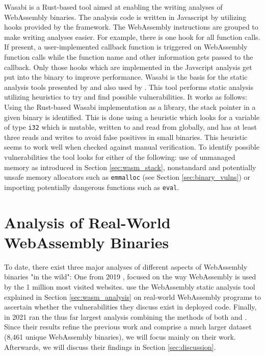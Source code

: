 \documentclass[sigconf]{acmart}
\begin{document}
Wasabi \cite{lehmann_wasabi_2018} is a Rust-based tool aimed at enabling the writing analyses of WebAssembly binaries. The analysis code is written in Javascript by utilizing hooks provided by the framework. The WebAssembly instructions are grouped to make writing analyses easier. For example, there is one hook for all function calls. If present, a user-implemented callback function is triggered on WebAssembly function calls while the function name and other information gets passed to the callback. Only those hooks which are implemented in the Javscript analysis get put into the binary to improve performance. Wasabi is the basis for the static analysis tools presented by \citet{lehmann_everything_2020} and also used by \citet{hilbig_empirical_2021}. This tool performs static analysis utilizing heuristics to try and find possible vulnerabilities. It works as follows: Using the Rust-based Wasabi implementation as a library, the stack pointer in a given binary is identified. This is done using a heuristic which looks for a variable of type \texttt{i32} which is mutable, written to and read from globally, and has at least three reads and writes to avoid false positives in small binaries. This heuristic seems to work well when checked against manual verification. To identify possible vulnerabilities the tool looks for either of the following: use of unmanaged memory as introduced in Section \ref{sec:wasm_stack}, nonstandard and potentially unsafe memory allocators such as \texttt{emmalloc} (see Section \ref{sec:binary_vulns}) or importing potentially dangerous functions such as \texttt{eval}.

\section{Analysis of Real-World WebAssembly Binaries}
\label{sec:real_world_wasm_analysis}
To date, there exist three major analyses of different aspects of WebAssembly binaries "in the wild": One from 2019 \cite{musch_new_2019}, focused on the way WebAssembly is used by the 1 million most visited websites. \citet{lehmann_everything_2020} use the WebAssembly static analysis tool explained in Section \ref{sec:wasm_analysis} on real-world WebAssembly programs to ascertain whether the vulnerabilities they discuss exist in deployed code. Finally, in 2021 \citet{hilbig_empirical_2021} ran the thus far largest analysis combining the methods of both \citet{musch_new_2019} and \citet{lehmann_everything_2020}. Since their results refine the previous work and comprise a much larger dataset (8,461 unique WebAssembly binaries), we will focus mainly on their work. Afterwards, we will discuss their findings in Section \ref{sec:discussion}. 
\end{document}
